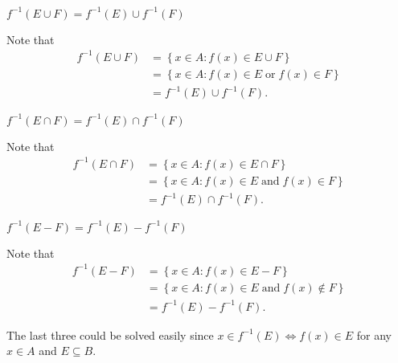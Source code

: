 \documentclass[12pt]{article}
\newenvironment{problem}[2][Problem]{\begin{trivlist} \item[\hskip \labelsep {\bfseries #1}\hskip \labelsep {\bfseries #2.}]}{\end{trivlist}}
\newenvironment{solution}[2][Solution]{\begin{trivlist} \item[\hskip \labelsep {\bfseries #1}\hskip \labelsep {\bfseries #2.}]}{\end{trivlist}}
\begin{document}
\begin{problem}{12}
\begin{enumerate}[label=(\alph*)]
\begin{solution}{(c)}
    \end{solution}
	\item $f^{-1}(E\cup F) = f^{-1}(E)\cup f^{-1}(F)$
	  \begin{solution}{(d)}
	    Note that
    \begin{align*}
      f^{-1}(E\cup F) &= \left\{x\in A: f(x)\in E\cup F\right\}\\
      &= \left\{x\in A: f(x)\in E \; \mathrm{or}\; f(x)\in F\right\}\\
      &= f^{-1}(E)\cup f^{-1}(F).
    \end{align*}
    \end{solution}
	\item $f^{-1}(E\cap F) = f^{-1}(E)\cap f^{-1}(F)$
	  \begin{solution}{(d)}
	    Note that
    \begin{align*}
      f^{-1}(E\cap F) &= \left\{x\in A: f(x)\in E\cap F\right\}\\
      &= \left\{x\in A: f(x)\in E\; \mathrm{and}\; f(x)\in F \right\}\\
      &= f^{-1}(E)\cap f^{-1}(F).
    \end{align*}
    \end{solution}
	\item $f^{-1}(E- F) = f^{-1}(E)- f^{-1}(F)$
	  \begin{solution}{(d)}
	    Note that
    \begin{align*}
      f^{-1}(E-F) &= \left\{x\in A:f(x)\in E-F\right\}\\
      &= \left\{x\in A: f(x)\in E \; \mathrm{and} \; f(x)\not\in F\right\}\\
      &= f^{-1}(E)-f^{-1}(F).
    \end{align*}
    \end{solution}
    The last three could be solved easily since $x\in f^{-1}(E) \iff f(x)\in E$ for any $x\in A$ and $E\subseteq B$.
    \end{enumerate}
    \end{problem}
 
\end{document}
